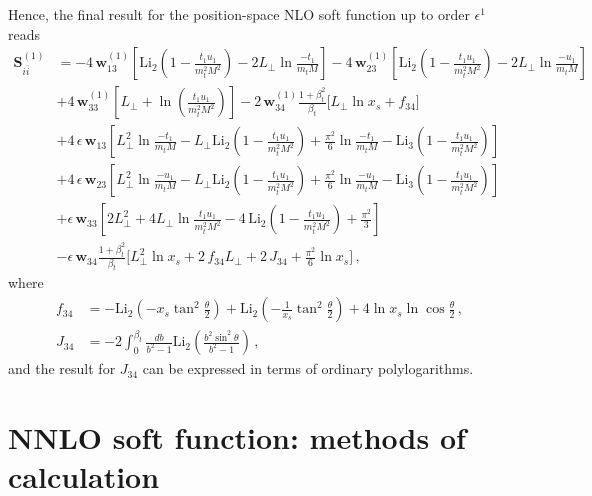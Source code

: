\documentclass[a4paper,11pt]{article}
\newcommand{\bfS}{\bm{S}}
\newcommand{\bfw}{\bm{w}}
\newcommand{\Litwo}{{\text{Li}_2}}
\numberwithin{equation}{section}
\begin{document}
Hence, the final result for the position-space NLO soft function up to order
$\epsilon^1$ reads
%
%
\allowdisplaybreaks
\begin{align}
\bfS_{i\bar i}^{(1)}  & =  
-4\, \bfw_{13}^{(1)}
\left[\text{Li}_2\left(1-\frac{t_1 u_1}{m_t^2 M^2}\right)
-2 L_\perp \ln \frac{-t_1}{m_t M}\right]
%
-4\, \bfw_{23}^{(1)}
\left[\text{Li}_2\left(1-\frac{t_1 u_1}{m_t^2 M^2}\right)
-2 L_\perp \ln \frac{-u_1}{m_t M}\right]
%
\nonumber \\
&
+4\, \bfw_{33}^{(1)}
\left[L_\perp+\ln \left(\frac{t_1 u_1}{m_t^2 M^2} \right)\right]
%
-2\, \bfw_{34}^{(1)}
\frac{1+\beta_t ^2}{\beta_t} \Big[L_\perp \ln x_s + f_{34} \Big]
%
\nonumber \\
&
+
4\, \epsilon\, \bfw_{13} 
\left[L_\perp^2 \ln \frac{-t_1}{m_t M}
-L_\perp \text{Li}_2\left(1-\frac{t_1 u_1}{m_t^2 M^2 }\right)+
\frac{\pi ^2}{6} \ln \frac{-t_1}{m_t M}
-\text{Li}_3\left(1-\frac{t_1 u_1}{m_t^2 M^2}\right)\right]
%
\nonumber \\
&
+
4\, \epsilon\, \bfw_{23} 
\left[L_\perp^2 \ln \frac{-u_1}{m_t M}
- L_\perp \text{Li}_2\left(1-\frac{t_1 u_1}{m_t^2 M^2 }\right)+
\frac{\pi^2}{6} \ln \frac{-u_1}{m_t M}
-\text{Li}_3\left(1-\frac{t_1 u_1}{m_t^2 M^2}\right)\right]
%
\nonumber \\
&
+
\epsilon\, \bfw_{33} 
\left[2 L_\perp^2 + 4  L_\perp \ln \frac{t_1 u_1}{m_t^2 M^2}
-4\, \text{Li}_2\left(1-\frac{t_1 u_1}{m_t^2 M^2 }\right)
+\frac{\pi^2}{3} \right]
%
\nonumber \\
&
-
\epsilon\, \bfw_{34} \frac{1+\beta_t ^2}{\beta_t} 
\Big[L_\perp^2 \ln x_s+ 2\, f_{34} L_\perp + 2\, J_{34} 
+\frac{\pi^2}{6} \ln x_s\Big]\,,
\label{eq:NLOSFres}
\end{align}
%
where
%
\begin{align}
  f_{34} & = 
  -\Litwo\left(-x_s\tan^2\frac{\theta}{2}\right)
  +\Litwo\left(-\frac{1}{x_s}\tan^2\frac{\theta}{2}\right)
  +4\ln x_s \ln\cos\frac{\theta}{2}\,,
  \\
  J_{34} & = -2 \int_0^{\beta_t} \frac{db}{b^2-1}
  \text{Li}_2\left(\frac{b^2 \sin ^2 \theta}{b^2-1}\right)\,,
\end{align}
%
and the result for $J_{34}$ can be expressed in terms of ordinary
polylogarithms.



\section{NNLO soft function: methods of calculation}
\label{sec:methods}
\end{document}
